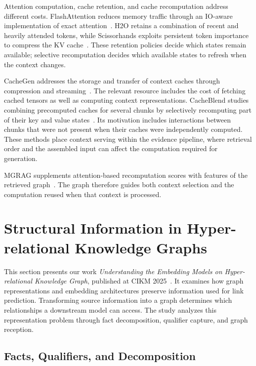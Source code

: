 Attention computation, cache retention, and cache recomputation address different costs. FlashAttention reduces memory traffic through an IO-aware implementation of exact attention~\cite{lit-dao2022flashattention}. H2O retains a combination of recent and heavily attended tokens, while Scissorhands exploits persistent token importance to compress the KV cache~\cite{lit-zhang2023h2o,lit-liu2023scissorhands}. These retention policies decide which states remain available; selective recomputation decides which available states to refresh when the context changes.

CacheGen addresses the storage and transfer of context caches through compression and streaming~\cite{bg-cachegen}. The relevant resource includes the cost of fetching cached tensors as well as computing context representations. CacheBlend studies combining precomputed caches for several chunks by selectively recomputing part of their key and value states~\cite{bg-cacheblend}. Its motivation includes interactions between chunks that were not present when their caches were independently computed. These methods place context serving within the evidence pipeline, where retrieval order and the assembled input can affect the computation required for generation.

MGRAG supplements attention-based recomputation scores with features of the retrieved graph~\cite{bg-mgrag}. The graph therefore guides both context selection and the computation reused when that context is processed.

\section{Structural Information in Hyper-relational Knowledge Graphs}
\label{sec:background:hyperkg}

This section presents our work \emph{Understanding the Embedding Models on Hyper-relational Knowledge Graph}, published at CIKM 2025~\cite{bg-hyperkg}. It examines how graph representations and embedding architectures preserve information used for link prediction. Transforming source information into a graph determines which relationships a downstream model can access. The study analyzes this representation problem through fact decomposition, qualifier capture, and graph reception.

\subsection{Facts, Qualifiers, and Decomposition}

